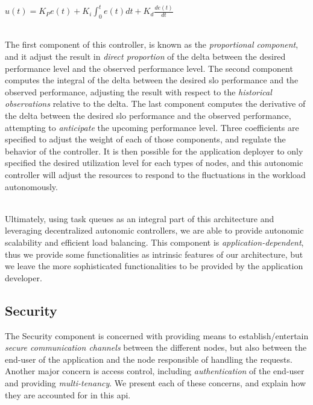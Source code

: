 \documentclass[12pt, titlepage]{uo_temp}
\begin{document}
     \\ \begin{center}
       $u(t)= K_P e(t) + K_i \int_0^t e(t) dt + K_d \frac{de(t)}{dt}$
       \end{center}\\

     The first component of this controller, is known as the \emph{proportional component}, and
     it adjust the result in \emph{direct proportion} of the delta between the desired
     performance level and the observed performance level.  The second component computes
     the integral of the delta between the desired \gls{slo} performance and the observed
     performance, adjusting the result with respect to the \emph{historical observations}
     relative to the delta. The last component computes the derivative of the delta
     between the desired \gls{slo} performance and the observed performance, attempting to
     \emph{anticipate} the upcoming performance level. Three coefficients are specified to adjust
     the weight of each of those components, and regulate the behavior of the
     controller. It is then possible for the application deployer to only specified the
     desired utilization level for each types of nodes, and this autonomic controller will
     adjust the resources to respond to the fluctuations in the workload autonomously. 
     
     \\ Ultimately, using task queues as an integral part of this architecture and
     leveraging decentralized autonomic controllers, we are able to provide autonomic
     scalability and efficient load balancing. This component is
     \emph{application-dependent}, thus we provide some functionalities as intrinsic
     features of our architecture, but we leave the more sophisticated functionalities to
     be provided by the application developer. 
     
     \subsection{Security}
     The Security component is concerned with providing means to establish/entertain
     \emph{secure communication channels} between the different nodes, but also between
     the end-user of the application and the node responsible of handling the
     requests. Another major concern is access control, including \emph{authentication} of
     the end-user and providing \emph{multi-tenancy}. We present each of these concerns,
     and explain how they are accounted for in this \gls{api}.
     
\end{document}
